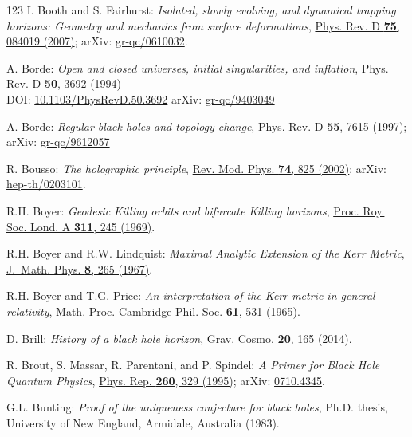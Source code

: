 \begin{thebibliography}{123}
I. Booth and S. Fairhurst:
{\em Isolated, slowly evolving, and dynamical trapping horizons: Geometry and mechanics from surface deformations},
\href{https://doi.org/10.1103/PhysRevD.75.084019}{Phys. Rev. D {\bf 75}, 084019 (2007)};
arXiv: \href{https://arxiv.org/abs/gr-qc/0610032}{gr-qc/0610032}.

A. Borde:
{\em Open and closed universes, initial singularities, and inflation},
Phys. Rev. D {\bf 50}, 3692 (1994)\\
DOI: \href{https://doi.org/10.1103/PhysRevD.50.3692}{10.1103/PhysRevD.50.3692}\hfill
arXiv: \href{https://arxiv.org/abs/gr-qc/9403049}{gr-qc/9403049}

A. Borde:
{\em Regular black holes and topology change},
\href{https://doi.org/10.1103/PhysRevD.55.7615}{Phys. Rev. D {\bf 55}, 7615 (1997)};
arXiv: \href{https://arxiv.org/abs/gr-qc/9612057}{gr-qc/9612057}

R. Bousso:
{\em The holographic principle},
\href{https://doi.org/10.1103/RevModPhys.74.825}{Rev. Mod. Phys. {\bf 74}, 825 (2002)};
arXiv: \href{https://arxiv.org/abs/hep-th/0203101}{hep-th/0203101}.

R.H. Boyer: {\em Geodesic Killing orbits and bifurcate Killing horizons},
\href{https://doi.org/10.1098/rspa.1969.0116}{Proc. Roy. Soc. Lond. A {\bf 311}, 245 (1969)}.

R.H. Boyer and R.W. Lindquist: {\em Maximal Analytic Extension of the Kerr Metric},
\href{https://doi.org/10.1063/1.1705193}{J.~Math. Phys. {\bf 8}, 265 (1967)}.

R.H. Boyer and T.G. Price: {\em An interpretation of the Kerr metric in general relativity},
\href{https://doi.org/10.1017/S0305004100004096}{Math. Proc. Cambridge Phil. Soc. {\bf 61}, 531 (1965)}.

D. Brill: {\em History of a black hole horizon},
\href{https://doi.org/10.1134/S0202289314030050}{Grav. Cosmo. {\bf 20}, 165 (2014)}.

R. Brout, S. Massar, R. Parentani, and P. Spindel:
{\em A Primer for Black Hole Quantum Physics},
\href{https://doi.org/10.1016/0370-1573(95)00008-5}{Phys. Rep. {\bf 260}, 329 (1995)};
arXiv: \href{https://arxiv.org/abs/0710.4345}{0710.4345}.

G.L. Bunting:
{\em Proof of the uniqueness conjecture for black holes},
Ph.D. thesis, University of New England, Armidale, Australia (1983).


\end{thebibliography}

